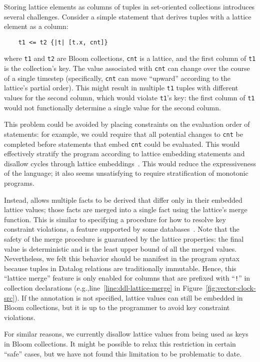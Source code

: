 Storing lattice elements as columns of tuples in set-oriented collections
introduces several challenges. Consider a simple \lang statement that derives
tuples with a lattice element as a column:
\begin{verbatim}
    t1 <= t2 {|t| [t.x, cnt]}
\end{verbatim}
where \texttt{t1} and \texttt{t2} are Bloom collections, \texttt{cnt} is
a lattice, and the first column of \texttt{t1} is the collection's key. The
value associated with \texttt{cnt} can change over the course of a single
timestep (specifically, \texttt{cnt} can move ``upward'' according to the
lattice's partial order). This might result in multiple \texttt{t1} tuples with
different values for the second column, which would violate \texttt{t1}'s
key: the first column of \texttt{t1} would not functionally determine a single
value for the second column.

This problem could be avoided by placing constraints on the evaluation order of
statements: for example, we could require that all potential changes to
\texttt{cnt} be completed before statements that embed \texttt{cnt} could be
evaluated. This would effectively stratify the program according to lattice
embedding statements and disallow cycles through lattice
embeddings~\cite{Apt1988}.  This would reduce the expressiveness of the
language; it also seems unsatisfying to require stratification of monotonic
programs.

Instead, \lang allows multiple facts to be derived that differ only in their
embedded lattice values; those facts are merged into a single fact using the
lattice's merge function. This is similar to specifying a procedure for how to
resolve key constraint violations, a feature supported by some
databases~\cite{oracle-conflict,sqlite-on-conflict}. Note that the safety of the
merge procedure is guaranteed by the lattice properties: the final value is
deterministic and is the least upper bound of all the merged
values. Nevertheless, we felt this behavior should be manifest in the program
syntax because tuples in Datalog relations are traditionally immutable. Hence,
this ``lattice merge'' feature is only enabled for columns that are prefixed
with ``\texttt{!}'' in collection declarations
(e.g.,line~\ref{line:ddl-lattice-merge} in
Figure~\ref{fig:vector-clock-src}). If the annotation is not specified, lattice
values can still be embedded in Bloom collections, but it is up to the
programmer to avoid key constraint violations.

For similar reasons, we currently disallow lattice values from being used as
keys in Bloom collections. It might be possible to relax this restriction in
certain ``safe'' cases, but we have not found this limitation to be problematic
to date.

